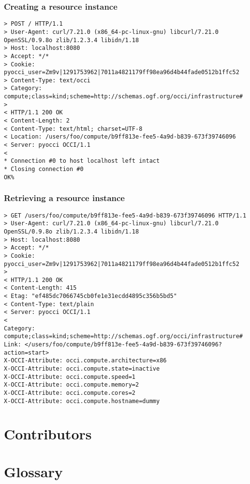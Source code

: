 \documentclass[10pt,a4paper]{article}
\begin{document}
\subsubsection{Creating a resource instance}
\begin{verbatim}
> POST / HTTP/1.1
> User-Agent: curl/7.21.0 (x86_64-pc-linux-gnu) libcurl/7.21.0 OpenSSL/0.9.8o zlib/1.2.3.4 libidn/1.18
> Host: localhost:8080
> Accept: */*
> Cookie: pyocci_user=Zm9v|1291753962|7011a4821179ff98ea96d4b44fade0512b1ffc52
> Content-Type: text/occi
> Category: compute;class=kind;scheme=http://schemas.ogf.org/occi/infrastructure#
> 
< HTTP/1.1 200 OK
< Content-Length: 2
< Content-Type: text/html; charset=UTF-8
< Location: /users/foo/compute/b9ff813e-fee5-4a9d-b839-673f39746096
< Server: pyocci OCCI/1.1
< 
* Connection #0 to host localhost left intact
* Closing connection #0
OK% 
\end{verbatim}

\subsubsection{Retrieving a resource instance}
\begin{verbatim}
> GET /users/foo/compute/b9ff813e-fee5-4a9d-b839-673f39746096 HTTP/1.1
> User-Agent: curl/7.21.0 (x86_64-pc-linux-gnu) libcurl/7.21.0 OpenSSL/0.9.8o zlib/1.2.3.4 libidn/1.18
> Host: localhost:8080
> Accept: */*
> Cookie: pyocci_user=Zm9v|1291753962|7011a4821179ff98ea96d4b44fade0512b1ffc52
> 
< HTTP/1.1 200 OK
< Content-Length: 415
< Etag: "ef485dc7066745cb0fe1e31ecdd4895c356b5bd5"
< Content-Type: text/plain
< Server: pyocci OCCI/1.1
< 
Category: compute;class=kind;scheme=http://schemas.ogf.org/occi/infrastructure#
Link: </users/foo/compute/b9ff813e-fee5-4a9d-b839-673f39746096?action=start>
X-OCCI-Attribute: occi.compute.architecture=x86
X-OCCI-Attribute: occi.compute.state=inactive
X-OCCI-Attribute: occi.compute.speed=1
X-OCCI-Attribute: occi.compute.memory=2
X-OCCI-Attribute: occi.compute.cores=2
X-OCCI-Attribute: occi.compute.hostname=dummy
\end{verbatim}

\section{Contributors}


\section{Glossary}
\label{sec:glossary}

\end{document}
